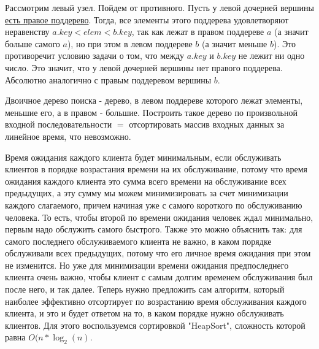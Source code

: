 \documentclass[12pt]{extreport}
\theoremstyle{definition}
\theoremstyle{definition}
\begin{document}
\Pr \hspace{1mm} Рассмотрим левый узел. Пойдем от противного. Пусть у левой дочерней вершины \underline{есть правое поддерево}. Тогда, все элементы этого поддерева удовлетворяют неравенству $a.key < elem < b.key$, так как лежат в правом поддереве $a$ (а значит больше самого $a$), но при этом в левом поддереве $b$ (а значит меньше $b$). Это противоречит условию задачи о том, что между $a.key$ и $b.key$ не лежит ни одно число. Это значит, что у левой дочерней вершины нет правого поддерева. Абсолютно аналогично с правым поддеревом вершины $b$.

\Pr \hspace{1mm} Двоичное дерево поиска - дерево, в левом поддереве которого лежат элементы, меньшие его, а в правом - большие. Построить такое дерево по произвольной входной последовательности $=$ отсортировать массив входных данных за линейное время, что невозможно.

\Pr \hspace{1mm} Время ожидания каждого клиента будет минимальным, если обслуживать клиентов в порядке возрастания времени на их обслуживание, потому что время ожидания каждого клиента это сумма всего времени на обслуживание всех предыдущих, а эту сумму мы можем минимизировать за счет минимизации каждого слагаемого, причем начиная уже с самого короткого по обслуживанию человека. То есть, чтобы второй по времени ожидания человек ждал минимально, первым надо обслужить самого быстрого. Также это можно объяснить так: для самого последнего обслуживаемого клиента не важно, в каком порядке обслуживали всех предыдущих, потому что его личное время ожидания при этом не изменится. Но уже для минимизации времени ожидания предпоследнего клиента очень важно, чтобы клиент с самым долгим временем обслуживания был после него, и так далее. Теперь нужно предложить сам алгоритм, который наиболее эффективно отсортирует по возрастанию время обслуживания каждого клиента, и это и будет ответом на то, в каком порядке нужно обслуживать клиентов. Для этого воспользуемся сортировкой "HeapSort", сложность которой равна $O(n * \log_2(n)$. 
\end{document}
